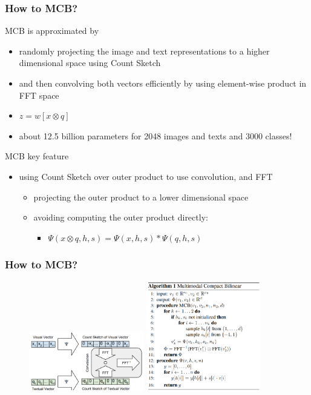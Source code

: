 \documentclass{beamer}
\begin{document}
\begin{frame}
\frametitle{How to MCB?}
MCB is approximated by
\begin{itemize}
\item randomly projecting the image and text representations to a \color{black}higher \color{black} dimensional space using Count Sketch
\item and then convolving both vectors efficiently by using element-wise product in FFT space
\item $z = w[x \otimes q]$
\item about 12.5 billion parameters for 2048 images and texts and 3000 classes!
\end{itemize}
MCB key feature
\begin{itemize}
\item using Count Sketch over outer product to use convolution, and FFT
\begin{itemize}
\item projecting the outer product to a lower dimensional space
\item avoiding computing the outer product directly:
\begin{itemize}
\item $\Psi(x \otimes q, h, s) = \Psi(x, h, s) * \Psi(q, h, s) $
\end{itemize}
\end{itemize}
\end{itemize}
\end{frame}
\begin{frame}
\frametitle{How to MCB?}
\begin{figure}%
    \centering
    {\includegraphics[width=5cm]{./images/How_to_MCB0202} }%
    \qquad
    {\includegraphics[width=5cm]{./images/How_to_MCB0201} }%
    \label{fig:example}%
\end{figure}
\end{frame}
\end{document}
